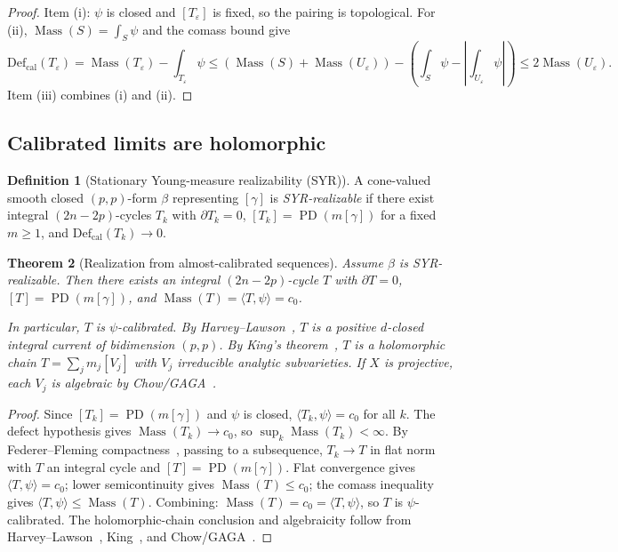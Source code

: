 \documentclass[11pt]{article}
\numberwithin{equation}{section}
\theoremstyle{plain}
\newtheorem{theorem}{Theorem}[section]
\theoremstyle{definition}
\newtheorem{definition}[theorem]{Definition}
\theoremstyle{remark}
\DeclareMathOperator{\Mass}{Mass}
\DeclareMathOperator{\PD}{PD}
\newcommand{\eps}{\varepsilon}
\newcommand{\Def}{\mathrm{Def}}
\newcommand{\Defcal}{\Def_{\mathrm{cal}}}
\begin{document}
\begin{proof}
Item (i): $\psi$ is closed and $[T_\eps]$ is fixed, so the pairing is
topological.
For (ii), $\Mass(S)=\int_S\psi$ and the comass bound give
\[
\Defcal(T_\eps)
=\Mass(T_\eps)-\int_{T_\eps}\psi
\le(\Mass(S)+\Mass(U_\eps))-(\int_S\psi-|\int_{U_\eps}\psi|)
\le 2\Mass(U_\eps).
\]
Item (iii) combines (i) and (ii).
\end{proof}


\subsection*{Calibrated limits are holomorphic}

\begin{definition}[Stationary Young-measure realizability (SYR)]
\label{def:syr}
A cone-valued smooth closed $(p,p)$-form $\beta$ representing $[\gamma]$ is
\emph{SYR-realizable} if there exist integral $(2n{-}2p)$-cycles $T_k$ with
$\partial T_k=0$, $[T_k]=\PD(m[\gamma])$ for a fixed $m\ge 1$, and
$\Defcal(T_k)\to 0$.
\end{definition}

\begin{theorem}[Realization from almost-calibrated sequences]
\label{thm:realization-from-almost}
Assume $\beta$ is SYR-realizable.  Then there exists an integral
$(2n{-}2p)$-cycle $T$ with $\partial T=0$, $[T]=\PD(m[\gamma])$, and
$\Mass(T)=\langle T,\psi\rangle=c_0$.

In particular, $T$ is $\psi$-calibrated.  By Harvey--Lawson~\cite{HL82},
$T$ is a positive $d$-closed integral current of bidimension $(p,p)$.
By King's theorem~\cite{King71}, $T$ is a holomorphic chain
$T=\sum_j m_j[V_j]$ with $V_j$ irreducible analytic subvarieties.
If $X$ is projective, each $V_j$ is algebraic by Chow/GAGA~\cite{Chow49,Serre56}.
\end{theorem}

\begin{proof}
Since $[T_k]=\PD(m[\gamma])$ and $\psi$ is closed,
$\langle T_k,\psi\rangle=c_0$ for all $k$.
The defect hypothesis gives $\Mass(T_k)\to c_0$, so
$\sup_k\Mass(T_k)<\infty$.
By Federer--Fleming compactness~\cite{Fed69}, passing to a subsequence,
$T_k\to T$ in flat norm with $T$ an integral cycle and $[T]=\PD(m[\gamma])$.
Flat convergence gives $\langle T,\psi\rangle=c_0$; lower semicontinuity
gives $\Mass(T)\le c_0$; the comass inequality gives
$\langle T,\psi\rangle\le\Mass(T)$.
Combining: $\Mass(T)=c_0=\langle T,\psi\rangle$, so $T$ is $\psi$-calibrated.
The holomorphic-chain conclusion and algebraicity follow from
Harvey--Lawson~\cite{HL82}, King~\cite{King71}, and Chow/GAGA~\cite{Chow49,Serre56,Hartshorne77,GH78}.
\end{proof}
\end{document}
